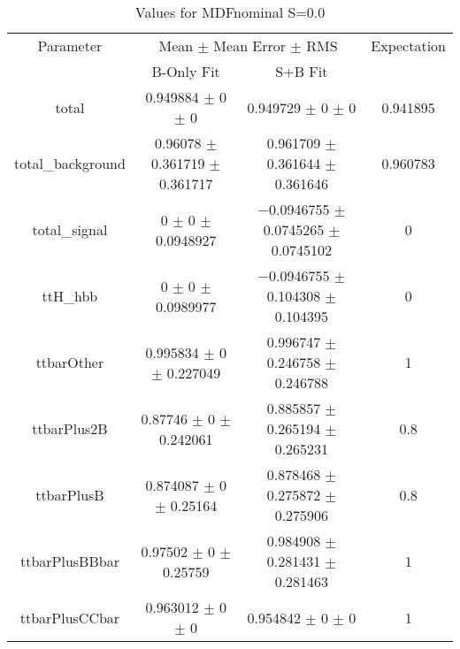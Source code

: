 \begin{table}
\centering
\caption{Values for MDFnominal S=0.0}
\begin{tabular}{cccc}
\toprule
Parameter & \multicolumn{2}{c}{Mean $\pm$ Mean Error $\pm$ RMS} & Expectation\\
 & B-Only Fit & S+B Fit & \\
\midrule
total & \num{0.949884} $\pm$ \num{0} $\pm$ \num{0} & \num{0.949729} $\pm$ \num{0} $\pm$ \num{0} & \num{0.941895}\\
total\_background & \num{0.96078} $\pm$ \num{0.361719} $\pm$ \num{0.361717} & \num{0.961709} $\pm$ \num{0.361644} $\pm$ \num{0.361646} & \num{0.960783}\\
total\_signal & \num{0} $\pm$ \num{0} $\pm$ \num{0.0948927} & \num{-0.0946755} $\pm$ \num{0.0745265} $\pm$ \num{0.0745102} & \num{0}\\
ttH\_hbb & \num{0} $\pm$ \num{0} $\pm$ \num{0.0989977} & \num{-0.0946755} $\pm$ \num{0.104308} $\pm$ \num{0.104395} & \num{0}\\
ttbarOther & \num{0.995834} $\pm$ \num{0} $\pm$ \num{0.227049} & \num{0.996747} $\pm$ \num{0.246758} $\pm$ \num{0.246788} & \num{1}\\
ttbarPlus2B & \num{0.87746} $\pm$ \num{0} $\pm$ \num{0.242061} & \num{0.885857} $\pm$ \num{0.265194} $\pm$ \num{0.265231} & \num{0.8}\\
ttbarPlusB & \num{0.874087} $\pm$ \num{0} $\pm$ \num{0.25164} & \num{0.878468} $\pm$ \num{0.275872} $\pm$ \num{0.275906} & \num{0.8}\\
ttbarPlusBBbar & \num{0.97502} $\pm$ \num{0} $\pm$ \num{0.25759} & \num{0.984908} $\pm$ \num{0.281431} $\pm$ \num{0.281463} & \num{1}\\
ttbarPlusCCbar & \num{0.963012} $\pm$ \num{0} $\pm$ \num{0} & \num{0.954842} $\pm$ \num{0} $\pm$ \num{0} & \num{1}\\
\bottomrule
\end{tabular}
\end{table}
